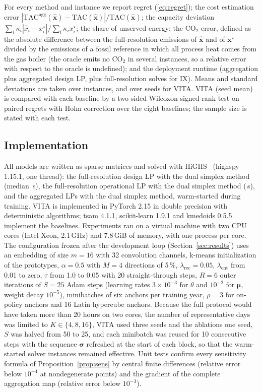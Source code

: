 \documentclass[journal]{IEEEtran}
\begin{document}
For every method and instance we report regret (\ref{eq:regret}); the cost estimation error $|\mathrm{TAC}^{\mathrm{agg}}(\hat{\bm{x}})-\mathrm{TAC}(\hat{\bm{x}})|/\mathrm{TAC}(\hat{\bm{x}})$; the capacity deviation $\sum_i\kappa_i|\hat{x}_i-x^{\star}_i|/\sum_i\kappa_ix^{\star}_i$; the share of unserved energy; the CO$_2$ error, defined as the absolute difference between the full-resolution emissions of $\hat{\bm{x}}$ and of $\bm{x}^{\star}$ divided by the emissions of a fossil reference in which all process heat comes from the gas boiler (the oracle emits no CO$_2$ in several instances, so a relative error with respect to the oracle is undefined); and the deployment runtime (aggregation plus aggregated design LP, plus full-resolution solves for IX). Means and standard deviations are taken over instances, and over seeds for VITA. VITA (seed mean) is compared with each baseline by a two-sided Wilcoxon signed-rank test on paired regrets with Holm correction over the eight baselines; the sample size is stated with each test.

\subsection{Implementation}
All models are written as sparse matrices and solved with HiGHS~\cite{huangfu2018highs} (highspy 1.15.1, one thread): the full-resolution design LP with the dual simplex method (median \OracleTimeMedian\,s), the full-resolution operational LP with the dual simplex method (\FullOperTimeMean\,s), and the aggregated LPs with the dual simplex method, warm-started during training. VITA is implemented in PyTorch 2.15 in double precision with deterministic algorithms; tsam 4.1.1, scikit-learn 1.9.1 and kmedoids 0.5.5 implement the baselines. Experiments ran on a virtual machine with two CPU cores (Intel Xeon, 2.1\,GHz) and 7.8\,GiB of memory, with one process per core. The configuration frozen after the development loop (Section~\ref{sec:results}) uses an embedding of size $m=16$ with 32 convolution channels, k-means initialization of the prototypes, $\alpha=0.5$ with $M=4$ directions of 5\,\%, $\lambda_{\mathrm{rec}}=0.05$, $\lambda_{\mathrm{ent}}$ from 0.01 to zero, $\tau$ from 1.0 to 0.05 with 20 straight-through steps, $R=6$ outer iterations of $S=25$ Adam steps (learning rates $3\times10^{-3}$ for $\theta$ and $10^{-2}$ for $\bm{\mu}$, weight decay $10^{-5}$), minibatches of six anchors per training year, $\rho=3$ for on-policy anchors and 16 Latin hypercube anchors. Because the full protocol would have taken more than 20 hours on two cores, the number of representative days was limited to $K\in\{4,8,16\}$, VITA used three seeds and the ablations one seed, $S$ was halved from 50 to 25, and each minibatch was reused for 10 consecutive steps with the sequence $\bm{\sigma}$ refreshed at the start of each block, so that the warm-started solver instances remained effective. Unit tests confirm every sensitivity formula of Proposition~\ref{prop:sens} by central finite differences (relative error below $10^{-4}$ at nondegenerate points) and the gradient of the complete aggregation map (relative error below $10^{-3}$).
\end{document}
